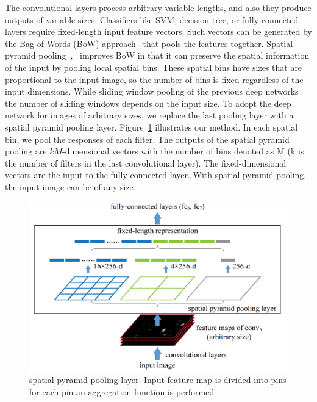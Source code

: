 The convolutional layers process arbitrary variable lengths, and also they produce outputs of variable sizes. Classifiers like SVM, decision tree, or fully-connected layers require fixed-length input feature vectors. Such vectors can be generated by the Bag-of-Words (BoW) approach~\cite{sivic2003video} that pools the features together. Spatial pyramid pooling~\cite{grauman2005pyramid},~\cite{lazebnik2006beyond} improves BoW in that it can preserve the spatial information of the input by pooling local spatial bins. These spatial bins have sizes that are proportional to the input image, so the number of bins is fixed regardless of the input dimensions. While sliding window pooling of the previous deep networks~\cite{krizhevsky2012imagenet} the number of sliding windows depends on the input size. To adopt the deep network for images of arbitrary sizes, we replace the last pooling layer with a spatial pyramid pooling layer.
Figure~\ref{originalSpp} illustrates our method. In each spatial bin, we pool the responses of each filter. The outputs of the spatial pyramid pooling are $kM$-dimensional vectors with the number of bins denoted as M (k is the number of filters in the last convolutional layer). The fixed-dimensional vectors are the input to the fully-connected layer. With spatial pyramid pooling, the input image can be of any size.
\begin{figure}
    \begin{center}
        \includegraphics[width=\textwidth]{Figures/SPP.png}
        \caption{\label{originalSpp} spatial pyramid
        pooling layer. Input feature map is divided into pins for each pin an aggregation function is performed\cite{he2015spatial}}
    \end{center}
\end{figure}

